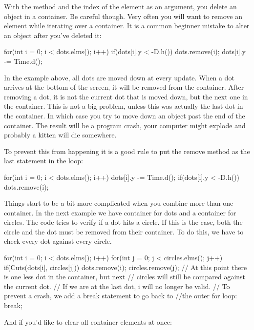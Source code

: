 With the method  and the index of the element as an argument, you delete an object in a container. Be careful though. Very often you will want to remove an element while iterating over a container. It is a common beginner mistake to alter an object after you've deleted it:

\begin{code}
for(int i = 0; i < dots.elms(); i++) {
    if(dots[i].y < -D.h()) {
        dots.remove(i);
	}
	dots[i].y -= Time.d();
}
\end{code}

In the example above, all dots are moved down at every update. When a dot arrives at the bottom of the screen, it will be removed from the container. After removing a dot, it is not the current dot that is moved down, but the next one in the container. This is not a big problem, unless this was actually the last dot in the container. In which case you try to move down an object past the end of the container. The result will be a program crash, your computer might explode and probably a kitten will die somewhere.

To prevent this from happening it is a good rule to put the remove method as the last statement in the loop:

\begin{code}
for(int i = 0; i < dots.elms(); i++) {
	dots[i].y -= Time.d();
  if(dots[i].y < -D.h()) dots.remove(i);
}
\end{code}

Things start to be a bit more complicated when you combine more than one container. In the next example we have container for dots and a container for circles. The code tries to verify if a dot hits a circle. If this is the case, both the circle and the dot must be removed from their container. To do this, we have to check every dot against every circle.

\begin{code}
for(int i = 0; i < dots.elms(); i++) {
	for(int j = 0; j < circles.elms(); j++) {
	    if(Cuts(dots[i], circles[j])) {
		    dots.remove(i);
		    circles.remove(j);
		    // At this point there is one less dot in the container, but next 
		    // circles will still be compared against the current dot. 
		    // If we are at the last dot, i will no longer be valid. 
		    // To prevent a crash, we add a break statement to go back to 
		    //the outer for loop:
			break;
		}		
	}
}
\end{code}

And if you'd like to clear all container elements at once:

